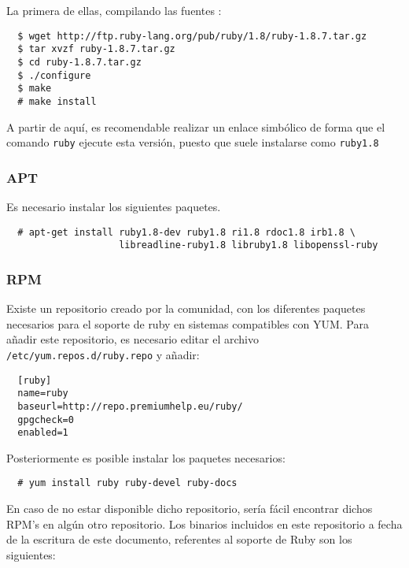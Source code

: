  La primera de ellas, compilando las fuentes :

\begin{verbatim}
  $ wget http://ftp.ruby-lang.org/pub/ruby/1.8/ruby-1.8.7.tar.gz
  $ tar xvzf ruby-1.8.7.tar.gz
  $ cd ruby-1.8.7.tar.gz
  $ ./configure
  $ make
  # make install
\end{verbatim}

A partir de aquí, es recomendable realizar un enlace simbólico de forma que el comando \texttt{ruby} ejecute esta versión, puesto que suele instalarse como \texttt{ruby1.8}


\subsubsection{APT} %
\label{ssub:apt}

Es necesario instalar los siguientes paquetes.

\begin{verbatim}
  # apt-get install ruby1.8-dev ruby1.8 ri1.8 rdoc1.8 irb1.8 \
                    libreadline-ruby1.8 libruby1.8 libopenssl-ruby
\end{verbatim}


\subsubsection{RPM} %
\label{ssub:rpm}

Existe un repositorio creado por la comunidad, con los diferentes paquetes necesarios para el soporte de ruby en sistemas compatibles con YUM. Para añadir este repositorio, es necesario editar el archivo \texttt{/etc/yum.repos.d/ruby.repo} y añadir:

\begin{verbatim}
  [ruby]
  name=ruby
  baseurl=http://repo.premiumhelp.eu/ruby/
  gpgcheck=0
  enabled=1
\end{verbatim}

Posteriormente es posible instalar los paquetes necesarios:

\begin{verbatim}
  # yum install ruby ruby-devel ruby-docs
\end{verbatim}

En caso de no estar disponible dicho repositorio, sería fácil encontrar dichos RPM's en algún otro repositorio. Los binarios incluidos en este repositorio a fecha de la escritura de este documento, referentes al soporte de Ruby son los siguientes:

